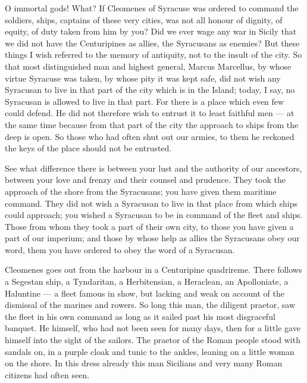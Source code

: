  O immortal gods! What? If Cleomenes of Syracuse was ordered to command the soldiers, ships, captains of these very cities, was not all honour of dignity, of equity, of duty taken from him by you? Did we ever wage any war in Sicily that we did not have the Centuripines as allies, the Syracusans as enemies? But these things I wish referred to the memory of antiquity, not to the insult of the city. So that most distinguished man and highest general, Marcus Marcellus, by whose virtue Syracuse was taken, by whose pity it was kept safe, did not wish any Syracusan to live in that part of the city which is in the Island; today, I say, no Syracusan is allowed to live in that part. For there is a place which even few could defend. He did not therefore wish to entrust it to least faithful men --- at the same time because from that part of the city the approach to ships from the deep is open. So those who had often shut out our armies, to them he reckoned the keys of the place should not be entrusted.

 See what difference there is between your lust and the authority of our ancestors, between your love and frenzy and their counsel and prudence. They took the approach of the shore from the Syracusans; you have given them maritime command. They did not wish a Syracusan to live in that place from which ships could approach; you wished a Syracusan to be in command of the fleet and ships. Those from whom they took a part of their own city, to those you have given a part of our imperium; and those by whose help as allies the Syracusans obey our word, them you have ordered to obey the word of a Syracusan.

 Cleomenes goes out from the harbour in a Centuripine quadrireme. There follows a Segestan ship, a Tyndaritan, a Herbitensian, a Heraclean, an Apolloniate, a Haluntine --- a fleet famous in show, but lacking and weak on account of the dismissal of the marines and rowers. So long this man, the diligent praetor, saw the fleet in his own command as long as it sailed past his most disgraceful banquet. He himself, who had not been seen for many days, then for a little gave himself into the sight of the sailors. The praetor of the Roman people stood with sandals on, in a purple cloak and tunic to the ankles, leaning on a little woman on the shore. In this dress already this man Sicilians and very many Roman citizens had often seen.

